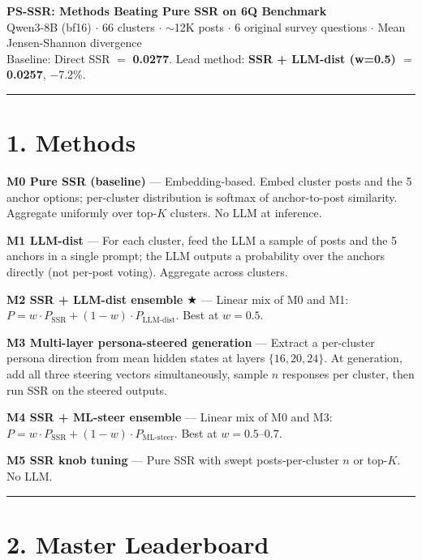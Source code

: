 \documentclass[10pt,a4paper]{article}
\begin{document}
\begin{center}
{\Large\bfseries PS-SSR: Methods Beating Pure SSR on 6Q Benchmark}\\[3pt]
{\small Qwen3-8B (bf16) $\cdot$ 66 clusters $\cdot$ $\sim$12K posts $\cdot$ 6 original survey questions $\cdot$ Mean Jensen-Shannon divergence}\\[2pt]
{\footnotesize Baseline: Direct SSR $=$ \textbf{0.0277}. Lead method: \textbf{SSR + LLM-dist (w=0.5) $=$ 0.0257}, $-$7.2\%.}
\end{center}

\vspace{-4pt}\hrule\vspace{6pt}

\section*{1. Methods}

\newcommand{\mheader}[2]{\textbf{#1} --- #2}

\mheader{M0 Pure SSR (baseline)}{Embedding-based. Embed cluster posts and the 5 anchor options; per-cluster distribution is softmax of anchor-to-post similarity. Aggregate uniformly over top-$K$ clusters. No LLM at inference.}

\mheader{M1 LLM-dist}{For each cluster, feed the LLM a sample of posts and the 5 anchors in a single prompt; the LLM outputs a probability over the anchors directly (not per-post voting). Aggregate across clusters.}

\mheader{M2 SSR + LLM-dist ensemble $\bigstar$}{Linear mix of M0 and M1: $P = w \cdot P_{\text{SSR}} + (1-w) \cdot P_{\text{LLM-dist}}$. Best at $w=0.5$.}

\mheader{M3 Multi-layer persona-steered generation}{Extract a per-cluster persona direction from mean hidden states at layers $\{16, 20, 24\}$. At generation, add all three steering vectors simultaneously, sample $n$ responses per cluster, then run SSR on the steered outputs.}

\mheader{M4 SSR + ML-steer ensemble}{Linear mix of M0 and M3: $P = w \cdot P_{\text{SSR}} + (1-w) \cdot P_{\text{ML-steer}}$. Best at $w = 0.5$--$0.7$.}

\mheader{M5 SSR knob tuning}{Pure SSR with swept posts-per-cluster $n$ or top-$K$. No LLM.}

\vspace{6pt}\hrule\vspace{6pt}

\section*{2. Master Leaderboard}
\end{document}

